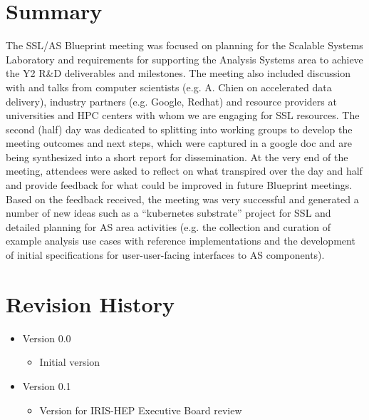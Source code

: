 \documentclass[11pt,letterpaper,fleqn]{article}
\begin{document}
\section{Summary}
\vspace{0.2cm}
The SSL/AS Blueprint meeting was focused on planning for the Scalable Systems Laboratory and requirements for supporting the Analysis Systems area to achieve the Y2 R\&D deliverables and milestones. The meeting also included discussion with and talks from computer scientists (e.g. A. Chien on accelerated data delivery), industry partners (e.g. Google, Redhat) and resource providers at universities and HPC centers with whom we are engaging for SSL resources. The second (half) day was dedicated to splitting into working groups to develop the meeting outcomes and next steps, which were captured in a google doc and are being synthesized into a short report for dissemination. At the very end of the meeting, attendees were asked to reflect on what transpired over the day and half and provide feedback for what could be improved in future Blueprint meetings. Based on the feedback received, the meeting was very successful and generated a number of new ideas such as a “kubernetes substrate” project for SSL and detailed planning for AS area activities (e.g. the collection and curation of example analysis use cases with reference implementations and the development of initial specifications for user-user-facing interfaces to AS components).


\appendix
\newpage
\section{Revision History}

\vspace{8pt}
\begin{itemize}
  \item Version 0.0
  \vspace{-5pt}
  \begin{itemize}
    \item Initial version
  \end{itemize}
  \item Version 0.1
  \vspace{-5pt}
  \begin{itemize}
    \item Version for IRIS-HEP Executive Board review
  \end{itemize}
\end{itemize}
\end{document}
